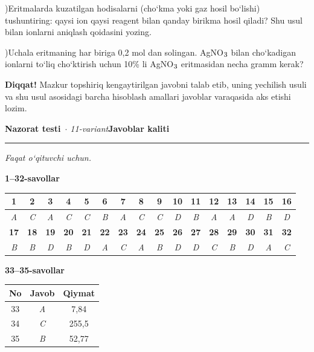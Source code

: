 \documentclass[11pt,a4paper]{article}
\renewcommand{\textsubscript}[1]{\ensuremath{_{\text{\fontsize{8}{8}\selectfont #1}}}}
\newcommand{\qsep}{\par\vspace{1pt}\noindent\rule{0pt}{0.4pt}\par\vspace{5pt}}
\newcommand{\diqqat}[1]{\par\smallskip\noindent\textbf{Diqqat!} #1\par\medskip}
\begin{document}
)Eritmalarda kuzatilgan hodisalarni (cho`kma yoki gaz hosil bo`lishi) tushuntiring: qaysi ion qaysi reagent bilan qanday birikma hosil qiladi? Shu usul bilan ionlarni aniqlash qoidasini yozing.\par
{})Uchala eritmaning har biriga 0,2 mol dan solingan. AgNO\textsubscript{3} bilan cho`kadigan ionlarni to`liq cho`ktirish uchun 10\% li AgNO\textsubscript{3} eritmasidan necha gramm kerak?\par
\diqqat{Mazkur topshiriq kengaytirilgan javobni talab etib, uning yechilish usuli va shu usul asosidagi barcha hisoblash amallari javoblar varaqasida aks etishi lozim.}\qsep
\newpage
\noindent\textbf{\fontsize{13}{15}\selectfont Nazorat testi}\ \textit{$\cdot$ 11-variant}\hfill \textbf{Javoblar kaliti}\par\smallskip\hrule\smallskip
\textit{Faqat o`qituvchi uchun.}\par\medskip
\noindent\textbf{1--32-savollar}\par\smallskip
\noindent\begin{tabular}{|c|c|c|c|c|c|c|c|c|c|c|c|c|c|c|c|}\hline
\textbf{1} & \textbf{2} & \textbf{3} & \textbf{4} & \textbf{5} & \textbf{6} & \textbf{7} & \textbf{8} & \textbf{9} & \textbf{10} & \textbf{11} & \textbf{12} & \textbf{13} & \textbf{14} & \textbf{15} & \textbf{16}\\\hline
\textsl{A} & \textsl{C} & \textsl{A} & \textsl{C} & \textsl{C} & \textsl{B} & \textsl{A} & \textsl{C} & \textsl{C} & \textsl{D} & \textsl{B} & \textsl{A} & \textsl{A} & \textsl{D} & \textsl{B} & \textsl{D}\\\hline
\textbf{17} & \textbf{18} & \textbf{19} & \textbf{20} & \textbf{21} & \textbf{22} & \textbf{23} & \textbf{24} & \textbf{25} & \textbf{26} & \textbf{27} & \textbf{28} & \textbf{29} & \textbf{30} & \textbf{31} & \textbf{32}\\\hline
\textsl{B} & \textsl{B} & \textsl{D} & \textsl{B} & \textsl{D} & \textsl{A} & \textsl{C} & \textsl{A} & \textsl{B} & \textsl{D} & \textsl{D} & \textsl{C} & \textsl{B} & \textsl{D} & \textsl{A} & \textsl{C}\\\hline
\end{tabular}\par\medskip
\noindent\textbf{33--35-savollar}\par\smallskip
\noindent\begin{tabular}{|c|c|c|}\hline \textbf{No} & \textbf{Javob} & \textbf{Qiymat}\\\hline
33 & \textsl{A} & 7,84\\\hline
34 & \textsl{C} & 255,5\\\hline
35 & \textsl{B} & 52,77\\\hline
\end{tabular}\par\medskip
\end{document}
